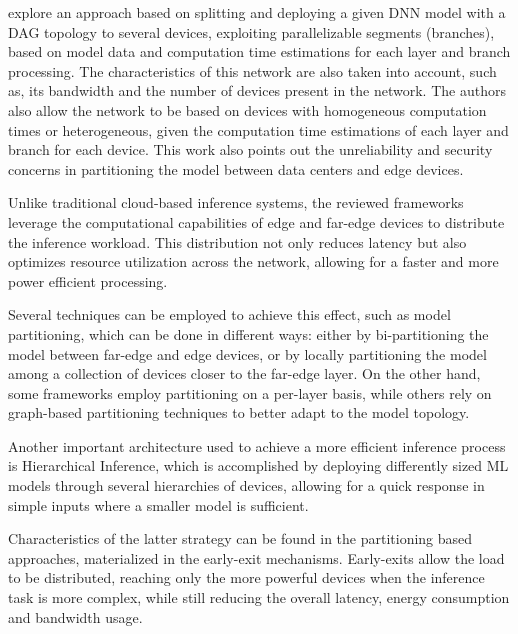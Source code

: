 \begin{description}[style=unboxed, leftmargin=1cm, font=\bfseries]
    \item[\textcite{w_miao_adaptive_2020}]
    explore an approach based on splitting and deploying a given \ac{DNN} model 
    with a \ac{DAG} topology to several devices, exploiting parallelizable 
    segments (branches), based on model data and computation time estimations 
    for each layer and branch processing.
    The characteristics of this network are also taken into account, such as, 
    its bandwidth and the number of devices present in the network. 
    The authors also allow the network to be based on devices with homogeneous 
    computation times or heterogeneous, given the computation time estimations
    of each layer and branch for each device.
    This work also points out the unreliability and security concerns in 
    partitioning the model between data centers and edge devices.

\end{description}

Unlike traditional cloud-based inference systems, the reviewed frameworks
leverage the computational capabilities of edge and far-edge devices to
distribute the inference workload. This distribution not only reduces latency
but also optimizes resource utilization across the network, allowing for a 
faster and more power efficient processing.

Several techniques can be employed to achieve this effect, such as model partitioning,
which can be done in different ways: either by bi-partitioning the model between
far-edge and edge devices, or by locally partitioning the model among a collection
of devices closer to the far-edge layer. On the other hand, some frameworks employ
partitioning on a per-layer basis, while others rely on graph-based partitioning
techniques to better adapt to the model topology.

Another important architecture used to achieve a more efficient inference process
is Hierarchical Inference, which is accomplished by deploying 
differently sized \ac{ML} models through several hierarchies of devices, allowing
for a quick response in simple inputs where a smaller model is sufficient.

Characteristics of the latter strategy can be found in the partitioning based 
approaches, materialized in the early-exit mechanisms. Early-exits allow the load to 
be distributed, reaching only the 
more powerful devices when the inference task is more complex, while still reducing
the overall latency, energy consumption and bandwidth usage. 

